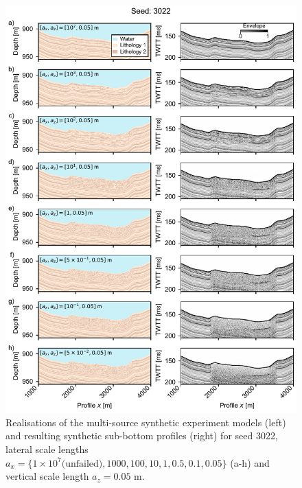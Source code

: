 \documentclass[se,manuscript]{copernicus}
\begin{document}
\begin{figure}
    \includegraphics{figures/si_fig05.pdf}
    \caption{Realisations of the multi-source synthetic experiment models (left) and resulting synthetic sub-bottom profiles (right) for seed 3022, lateral scale lengths $a_x=\{1 \times 10^7 \text{(unfailed)}, 1000, 100, 10, 1, 0.5, 0.1, 0.05\}$ (a-h) and vertical scale length $a_z=0.05$ m.}
    \label{fig:multi-source-3022}
\end{figure} 
\end{document}
